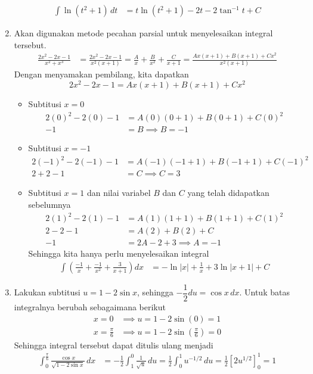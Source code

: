 \documentclass[11pt,openany,a4paper]{article}
\begin{document}
\begin{enumerate}
        \begin{align*}
          \int \ln(t^2 + 1) \, dt &= \boxed{t \ln(t^2 + 1) - 2t - 2\tan^{-1} t + C}
        \end{align*}
        \item Akan digunakan metode pecahan parsial untuk menyelesaikan integral tersebut. 
        \begin{align*}
          \frac{2x^2 - 2x - 1}{x^2 + x^3} &= \frac{2x^2 - 2x - 1}{x^2 (x+ 1)} = \frac{A}{x} + \frac{B}{x^2} + \frac{C}{x+1}= \frac{Ax(x + 1) + B(x+1) + Cx^2}{x^2(x+1)} 
        \end{align*}
        Dengan menyamakan pembilang, kita dapatkan
        \[
          2x^2 - 2x - 1 = Ax(x + 1) + B(x+1) + Cx^2
        \]
        \begin{itemize}
          \item Subtitusi $x=0$
          \begin{align*}
            2(0)^2 - 2(0) - 1 &= A(0)(0 + 1) + B(0+1) + C(0)^2 \\
            -1 &= B \implies B = -1
          \end{align*}
          \item Subtitusi $x=-1$
          \begin{align*}
            2(-1)^2 - 2(-1) - 1 &= A(-1)(-1 + 1) + B(-1+1) + C(-1)^2 \\
            2 + 2 - 1 &= C \implies C = 3
          \end{align*}
          \item Subtitusi $x=1$ dan nilai variabel $B$ dan $C$ yang telah didapatkan sebelumnya
          \begin{align*}
            2(1)^2 - 2(1) - 1 &= A(1)(1 + 1) + B(1+1) + C(1)^2 \\
            2 - 2 - 1 &= A(2) + B(2) + C \\
            -1 &= 2A - 2 + 3 \implies A = -1
          \end{align*}
          Sehingga kita hanya perlu menyelesaikan integral
          \begin{align*}
            \int \left(\frac{-1}{x} + \frac{-1}{x^2} + \frac{3}{x+1}\right)dx &= \boxed{-\ln|x| + \frac{1}{x} + 3\ln|x+1| + C}
          \end{align*}
        \end{itemize}
        \item Lakukan subtitusi $u = 1 - 2\sin x$, sehingga $-\dfrac{1}{2}du = \cos x \, dx$. Untuk batas integralnya berubah sebagaimana berikut
        \begin{align*}
          x = 0 &\implies u = 1 - 2\sin(0) = 1 \\
          x = \frac{\pi}{6} &\implies u = 1 - 2\sin\left(\frac{\pi}{6}\right) = 0
        \end{align*}
        Sehingga integral tersebut dapat ditulis ulang menjadi
        \begin{align*}
          \int_0^{\frac{\pi}{6}} \frac{\cos x}{\sqrt{1 - 2 \sin x}} \, dx &= -\frac{1}{2}\int_1^0 \frac{1}{\sqrt{u}}\,du = \frac{1}{2}\int_0^1 u^{-1/2}\,du = \frac{1}{2}\left[2u^{1/2}\right]_0^1 = \boxed{1}
        \end{align*}
    \end{enumerate}
\end{document}
